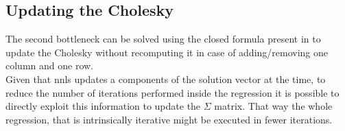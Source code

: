 \subsection{Updating the Cholesky}
The second bottleneck can be solved using the closed formula present in \cite{wiki:Cholesky_decomposition} to update the Cholesky without recomputing it in case of adding/removing one column and one row.\\
Given that nnls updates a components of the solution vector at the time, to reduce the number of iterations performed inside the regression it is possible to directly exploit this information to update the $\Sigma$ matrix. That way the whole regression, that is intrinsically iterative might be executed in fewer iterations.\\

